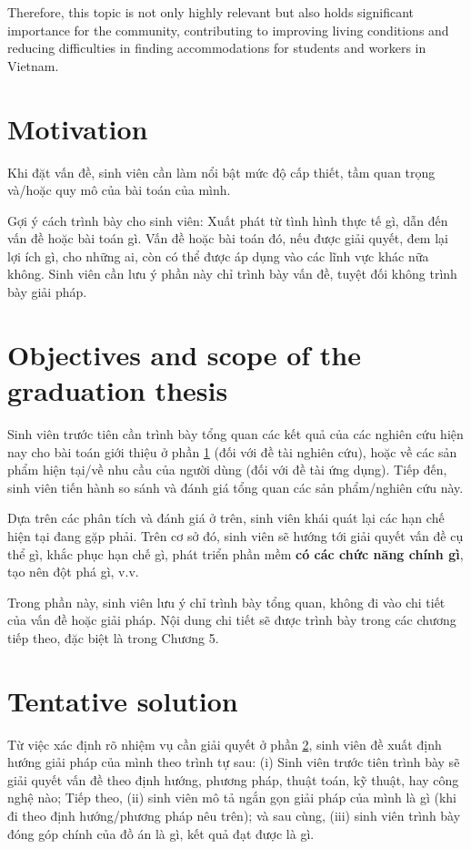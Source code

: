 \documentclass[../Main.tex]{subfiles}
\begin{document}
Therefore, this topic is not only highly relevant but also holds significant importance for the community, contributing to improving living conditions and reducing difficulties in finding accommodations for students and workers in Vietnam.

\section{Motivation}
\label{section:1.1}
Khi đặt vấn đề, sinh viên cần làm nổi bật mức độ cấp thiết, tầm quan trọng và/hoặc quy mô của bài toán của mình.

Gợi ý cách trình bày cho sinh viên: Xuất phát từ tình hình thực tế gì, dẫn đến vấn đề hoặc bài toán gì.
Vấn đề hoặc bài toán đó, nếu được giải quyết, đem lại lợi ích gì, cho những ai, còn có thể được áp dụng vào các lĩnh vực khác nữa không.
Sinh viên cần lưu ý phần này chỉ trình bày vấn đề, tuyệt đối không trình bày giải pháp.

\section{Objectives and scope of the graduation thesis}
\label{section:1.2}
Sinh viên trước tiên cần trình bày tổng quan các kết quả của các nghiên cứu hiện nay cho bài toán giới thiệu ở phần \ref{section:1.1} (đối với đề tài nghiên cứu), hoặc về các sản phẩm hiện tại/về nhu cầu của người dùng (đối với đề tài ứng dụng).
Tiếp đến, sinh viên tiến hành so sánh và đánh giá tổng quan các sản phẩm/nghiên cứu này.

Dựa trên các phân tích và đánh giá ở trên, sinh viên khái quát lại các hạn chế hiện tại đang gặp phải.
Trên cơ sở đó, sinh viên sẽ hướng tới giải quyết vấn đề cụ thể gì, khắc phục hạn chế gì, phát triển phần mềm \textbf{có các chức năng chính gì}, tạo nên đột phá gì, v.v.

Trong phần này, sinh viên lưu ý chỉ trình bày tổng quan, không đi vào chi tiết của vấn đề hoặc giải pháp.
Nội dung chi tiết sẽ được trình bày trong các chương tiếp theo, đặc biệt là trong Chương 5.

\section{Tentative solution}
\label{section:1.3}
Từ việc xác định rõ nhiệm vụ cần giải quyết ở phần \ref{section:1.2}, sinh viên đề xuất định hướng giải pháp của mình theo trình tự sau: (i) Sinh viên trước tiên trình bày sẽ giải quyết vấn đề theo định hướng, phương pháp, thuật toán, kỹ thuật, hay công nghệ nào; Tiếp theo, (ii) sinh viên mô tả ngắn gọn giải pháp của mình là gì (khi đi theo định hướng/phương pháp nêu trên); và sau cùng, (iii) sinh viên trình bày đóng góp chính của đồ án là gì, kết quả đạt được là gì.
\end{document}

